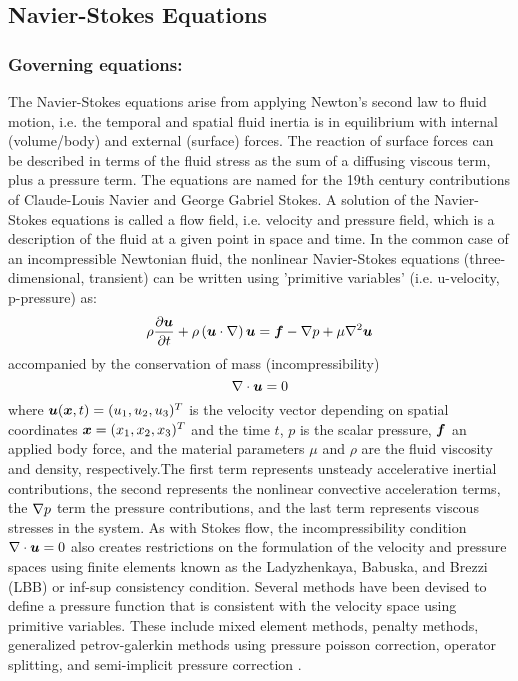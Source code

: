 \subsection{Navier-Stokes Equations} 

\subsubsection{Governing equations:}

The Navier-Stokes equations arise from applying Newton's second law to fluid motion, i.e. the temporal and spatial fluid inertia is in equilibrium with internal (volume/body)  and external (surface) forces. The reaction of surface forces can be described in terms of the fluid stress as the sum of a diffusing viscous term, plus a pressure term. The equations are named for the 19th century contributions of Claude-Louis Navier and George Gabriel Stokes. A solution of the Navier-Stokes equations is called a flow field, i.e. velocity and pressure field, which is a description of the fluid at a given point in space and time.  In the common case of an incompressible Newtonian fluid, the nonlinear Navier-Stokes equations (three-dimensional, transient) can be written using 'primitive variables' (i.e. u-velocity, p-pressure) as:
\begin{equation}
  \label{eqn:NSE}
    \rho\delby{\vectr{u}}{t}+\rho\pbrac{\dotprod{\vectr{u}}{\grad}}\vectr{u}=\vectr{f}-\gradient{}{p}+\mu\laplacian{\vectr{u}}
\end{equation}
accompanied by the conservation of mass (incompressibility)
\begin{equation}
  \label{eqn:NSEIncompressibility}
  \divergence{}{\vectr{u}}=0
\end{equation}
where $\boldsymbol{u}(\boldsymbol{x},t)=(u_1,u_2,u_3)^T$ is the velocity vector depending on spatial coordinates $\boldsymbol{x}=(x_1,x_2,x_3)^T$ and the time $t$, $p$ is the scalar pressure, $\boldsymbol{f}$ an applied body force, and the material parameters $\mu$ and $\rho$ are the fluid viscosity and density, respectively.The first term represents unsteady accelerative inertial contributions, the second represents the nonlinear convective acceleration terms, the $\gradient{}{p}$ term the pressure contributions, and the last term represents viscous stresses in the system.
As with Stokes flow, the incompressibility condition $\divergence{}{\vectr{u}}=0$ also creates restrictions on the formulation of the velocity and pressure spaces using finite elements known as the Ladyzhenkaya, Babuska, and Brezzi (LBB) or inf-sup consistency condition. Several methods have been devised to define a pressure function that is consistent with the velocity space using primitive variables. These include mixed element methods, penalty methods, generalized petrov-galerkin methods using pressure poisson correction, operator splitting, and semi-implicit pressure correction \cite{chung:2010}.

